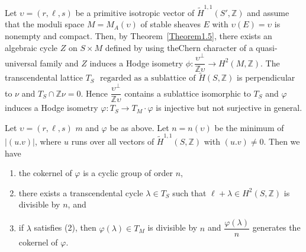 Let $\upsilon=(r,\ell, s)$ be a primitive isotropic vector of
$\widetilde{H}^{1,1}(S',\mathbb{Z})$ and assume that the moduli space
$M=M_A(\upsilon)$ of stable sheaves $E$ with $\upsilon(E)=\upsilon$ is
nonempty and compact. Then, by Theorem~\ref{Theorem1.5}, there exists
an algebraic cycle $Z$ on $S\times M$ defined by using the\pageoriginale Chern
character of a quasi-universal family and $Z$ induces a Hodge isometry
$\phi:\dfrac{\upsilon^{\perp}}{\mathbb{Z}\upsilon}\to
H^{2}(M,\mathbb{Z})$. The transcendental lattice $T_S$ $\text{ regarded as a
sublattice of }\widetilde{H}(S,\mathbb{Z})$ is perpendicular to $\nu$
and $T_S\cap \mathbb{Z}\nu=0$. Hence
$\dfrac{\upsilon^{\perp}}{\mathbb{Z}\upsilon}$ contains a sublattice
isomorphic to $T_S$ and $\varphi$ induces a Hodge isometry
$\varphi:T_S\to T_M\cdot \varphi$ is injective but not surjective in
general. 

\begin{Prop}\label{Prop6.4}
Let $\upsilon=(r,\ell, s)$ $m$ and $\varphi$ be as above. Let
$n=n(\upsilon)$ be the minimum of $|(u.v)|$, where $u$ runs over all
vectors of $\widetilde{H}^{1,1}(S,\mathbb{Z})$ with $(u.v)\neq
0$. Then we have 
\begin{enumerate}
\renewcommand{\labelenumi}{(\theenumi)}
\item the cokernel of $\varphi$ is a cyclic group of order $n$, 

\item there exists a transcendental cycle $\lambda \in T_S$ such that
$\ell+\lambda \in H^{2}(S,\mathbb{Z})$ is divisible by $n$, and 

\item if $\lambda$ satisfies (2), then  $\varphi(\lambda)\in T_M$ is
divisible by $n$ and $\dfrac{\varphi(\lambda)}{n}$ generates the
cokernel of $\varphi$. 
\end{enumerate}
\end{Prop}

